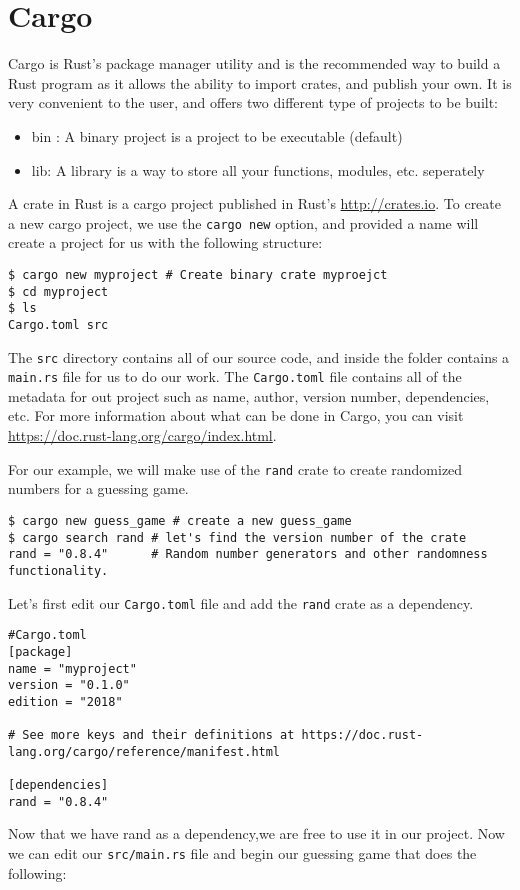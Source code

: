 \chapter{Cargo}
\par Cargo is Rust's package manager utility and is the recommended way to build a Rust program as it allows the ability to import crates, and publish your own. 
It is very convenient to the user, and offers two different type of projects to be built: 

\begin{itemize}
    \item bin : A binary project is a project to be executable (default)
    \item lib: A library is a way to store all your functions, modules, etc. seperately
\end{itemize}
\par A crate in Rust is a cargo project published in Rust's \url{http://crates.io}.  
To create a new cargo project, we use the \verb!cargo new! option, and provided a name will create 
a project for us with the following structure:

\lstset{language=sh}
\begin{lstlisting}
$ cargo new myproject # Create binary crate myproejct
$ cd myproject
$ ls
Cargo.toml src
\end{lstlisting}

\par  The \verb!src! directory contains all of our source code, and inside the folder contains a \verb!main.rs! file for us to do our work. 
The \verb!Cargo.toml! file contains all of the metadata for out project such as name, author, version number, dependencies, etc. 
For more information about what can be done in Cargo, you can visit \url{https://doc.rust-lang.org/cargo/index.html}.

\par  For our example, we will make use of the \verb!rand! crate to create randomized numbers for a guessing game. 

\begin{lstlisting}
$ cargo new guess_game # create a new guess_game
$ cargo search rand # let's find the version number of the crate
rand = "0.8.4"      # Random number generators and other randomness functionality.
\end{lstlisting}

\par  Let's first edit our \verb!Cargo.toml! file and add the \verb!rand! crate as a dependency.
\begin{lstlisting}
#Cargo.toml
[package]
name = "myproject"
version = "0.1.0"
edition = "2018"
    
# See more keys and their definitions at https://doc.rust-lang.org/cargo/reference/manifest.html
    
[dependencies]
rand = "0.8.4"
\end{lstlisting}
\par Now that we have rand as a dependency,we are free to use it in our project. 
Now we can edit our \verb!src/main.rs! file and begin our guessing game that does the following:

